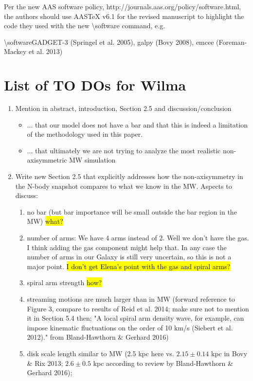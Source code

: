 \documentclass[10pt,a4paper]{article}
\begin{document}
Per the new AAS software policy, http://journals.aas.org/policy/software.html, the
authors should use AASTeX v6.1 for the revised manuscript to highlight the code they
used with the new {\textbackslash}software command, e.g.

{\textbackslash}software{GADGET-3 (Springel et al. 2005), galpy (Bovy 2008), emcee (Foreman-Mackey
et al. 2013)}

\section{List of TO DOs for Wilma}


\begin{enumerate}
\item Mention in abstract, introduction, Section 2.5 and discussion/conclusion 
\begin{itemize}
\item ... that our model does not have a bar and that this is indeed a limitation of the methodology used in this paper. 
\item ... that ultimately we are not trying to analyze the most realistic non-axisymmetric MW simulation
\end{itemize}
\item Write new Section 2.5 that explicitly addresses how the non-axisymmetry in the N-body snapshot compares to what we know in the MW. Aspects to discuss:
\begin{enumerate}
\item no bar (but bar importance will be small outside the bar region in the MW) \hl{what?}
\item number of arms:  We have 4 arms instead of 2. Well  we don't have the gas. I think adding the gas component might help that. In any case the number of arms in our Galaxy is still very uncertain, so this is not a major point. \hl{I don't get Elena's point with the gas and spiral arms?}
\item spiral arm strength \hl{how?}
\item streaming motions are much larger than in MW (forward reference to Figure 3, compare to results of Reid et al. 2014; make sure not to mention it in Section 5.4 then; "A local spiral arm
density wave, for example, can impose kinematic fluctuations on the order of 10 km/s (Siebert et al. 2012)." from Bland-Hawthorn \& Gerhard 2016)
\item disk scale length similar to MW (2.5 kpc here vs. $2.15\pm0.14$ kpc in Bovy \& Rix 2013; $2.6\pm0.5$ kpc according to review by Bland-Hawthorn \& Gerhard 2016); 

\end{enumerate}
\end{enumerate}
\end{document}
